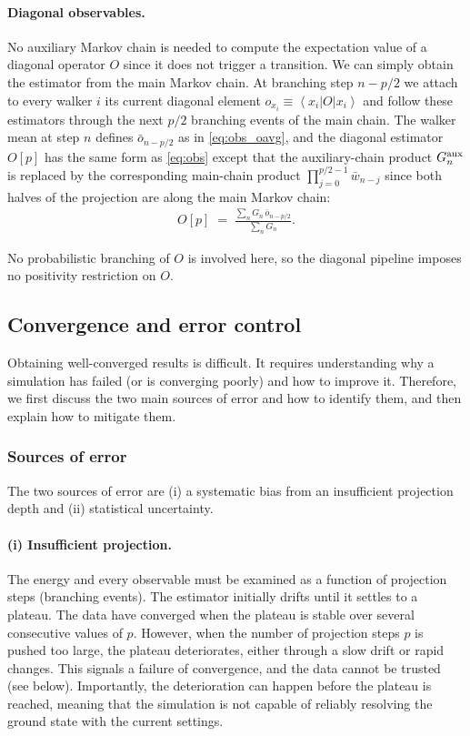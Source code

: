 \documentclass{SciPost}
\providecommand{\ket}[1]{\left|#1\right\rangle}
\providecommand{\bra}[1]{\left\langle#1\right|}
\begin{document}
\paragraph{Diagonal observables.}
No auxiliary Markov chain is needed to compute the expectation value of a diagonal operator $O$ since it does not trigger a transition.
%
We can simply obtain the estimator from the main Markov chain.
%
At branching step $n-p/2$ we attach to every walker $i$ its current diagonal element $o_{x_i} \equiv \bra{x_i} O \ket{x_i}$ and follow these estimators through the next $p/2$ branching events of the main chain.
%
The walker mean at step $n$ defines $\bar o_{n-p/2}$ as in \autoref{eq:obs_oavg}, and the diagonal estimator $O[p]$ has the same form as \autoref{eq:obs} except that the auxiliary-chain product $G^{\rm aux}_n$ is replaced by the corresponding main-chain product $\prod_{j=0}^{p/2-1} \bar w_{n-j}$ since both halves of the projection are along the main Markov chain:
\begin{align}
	O[p] \;=\; \frac{\sum_n G_n \, \bar{o}_{n-p/2}}{\sum_n G_n}.
\end{align}

No probabilistic branching of $O$ is involved here, so the diagonal pipeline imposes no positivity restriction on $O$.




\subsection{Convergence and error control}\label{sec:gfmc:simulation}

Obtaining well-converged results is difficult.
%
It requires understanding why a simulation has failed (or is converging poorly) and how to improve it.
%
Therefore, we first discuss the two main sources of error and how to identify them, and then explain how to mitigate them.

\subsubsection{Sources of error}\label{sec:errors}
The two sources of error are (i) a systematic bias from an insufficient projection depth and (ii) statistical uncertainty.

\paragraph{(i) Insufficient projection.}
The energy and every observable must be examined as a function of projection steps (branching events).
%
The estimator initially drifts until it settles to a plateau.
%
The data have converged when the plateau is stable over several consecutive values of $p$.
%
However, when the number of projection steps $p$ is pushed too large, the plateau deteriorates, either through a slow drift or rapid changes.
%
This signals a failure of convergence, and the data cannot be trusted (see below).
%
Importantly, the deterioration can happen before the plateau is reached, meaning that the simulation is not capable of reliably resolving the ground state with the current settings.
\end{document}
